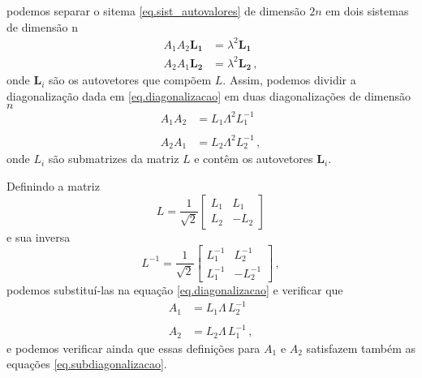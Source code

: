 podemos separar o sitema \ref{eq.sist_autovalores} de dimens\~ao $2n$ em dois sistemas de dimens\~ao n
\begin{align*}
A_1A_2\mathbf{L_1}&=\lambda^2\mathbf{L_1}\\
A_2A_1\mathbf{L_2}&=\lambda^2\mathbf{L_2}\,,
\end{align*}
onde $\mathbf{L}_i$ s\~ao os autovetores que comp\~oem $L$.
Assim, podemos dividir a diagonaliza\c{c}\~ao dada em \ref{eq.diagonalizacao} em duas diagonaliza\c{c}\~oes de dimens\~ao $n$
\begin{align}\label{eq.subdiagonalizacao}\nonumber
A_1A_2&=L_1\Lambda^2L_1^{-1}\\\quad\\\nonumber
A_2A_1&=L_2\Lambda^2L_2^{-1}\,,
\end{align}
onde $L_i$ s\~ao submatrizes da matriz $L$ e cont\^em os autovetores $\mathbf{L}_i$.



Definindo a matriz 
\begin{equation}\label{eq.L}
L=\frac{1}{\sqrt{2}}
\begin{bmatrix}
L_1&L_1\\
L_2&-L_2
\end{bmatrix}
\end{equation}
e sua inversa
\begin{equation}\label{eq.L_inversa}
L^{-1}=\frac{1}{\sqrt{2}}
\begin{bmatrix}
L_1^{-1}&L_2^{-1}\\
L_1^{-1}&-L_2^{-1}
\end{bmatrix}\,,
\end{equation}
podemos substitu\'i-las na equa\c{c}\~ao \ref{eq.diagonalizacao} e verificar que 
\begin{align}\label{eq.definicao_A1_A2}\nonumber
A_1&=L_1\Lambda\,L_2^{-1}\\\quad\\\nonumber
A_2&=L_2\Lambda\,L_1^{-1}\,,
\end{align}
e podemos verificar ainda que essas defini\c{c}\~oes para $A_1$ e $A_2$ satisfazem tamb\'em as equa\c{c}\~oes \ref{eq.subdiagonalizacao}.

